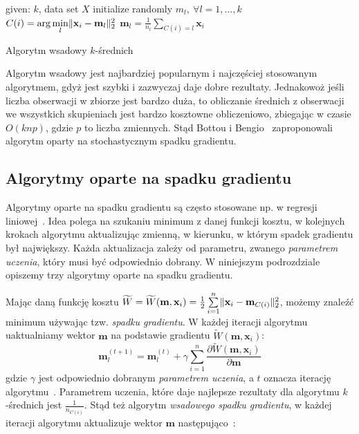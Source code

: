 \documentclass{praca1}
\DeclarePairedDelimiter{\norm}{\lVert}{\rVert}
\begin{document}
\begin{algorithm}[!h]
\begin{algorithmic}[1]
		\State given: $k$, data set $X$
        \State initialize randomly $m_l, \ \forall l=1, ..., k$
        \Repeat
                \State $C(i) = \arg \min\limits_{l} \norm{\mathbf{x}_i - \mathbf{m}_l }_2^2 $
            \EndFor
                \State $\mathbf{m}_l = \frac{1}{n_l}\sum\limits_{C(i) = l} \mathbf{x}_i$
            \EndFor

\end{algorithmic}
\caption{Algorytm wsadowy $k$-średnich}\label{alg:001}
\end{algorithm}

Algorytm wsadowy jest najbardziej popularnym i najczęściej stosowanym algorytmem, gdyż jest szybki i zazwyczaj daje dobre rezultaty. Jednakowoż jeśli liczba obserwacji w zbiorze jest bardzo duża, to obliczanie średnich z obserwacji we wszystkich skupieniach jest bardzo kosztowne obliczeniowo, zbiegając w czasie $O(knp)$, gdzie $p$ to liczba zmiennych. Stąd Bottou i Bengio~\cite{Bottou1995:convergenceproperties} zaproponowali algorytm oparty na stochastycznym spadku gradientu.

\subsection{Algorytmy oparte na spadku gradientu}

Algorytmy oparte na spadku gradientu są często stosowane np. w regresji liniowej~\cite{Bottou2012:sgdtricks}. Idea polega na szukaniu minimum z danej funkcji kosztu, w kolejnych krokach algorytmu aktualizując zmienną, w kierunku, w którym spadek gradientu był największy. Każda aktualizacja zależy od parametru, zwanego \emph{parametrem uczenia}, który musi być odpowiednio dobrany. W niniejszym podrozdziale opiszemy trzy algorytmy oparte na spadku gradientu.


Mając daną funkcję kosztu $\widetilde{W} = \widetilde{W}(\mathbf{m}, \mathbf{x}_i) = \frac{1}{2}\sum\limits_{i=1}^{n} \norm{\mathbf{x}_i - \mathbf{m}_{C(i)}}_2^2 $, możemy znaleźć minimum używając tzw. \emph{spadku gradientu}. W każdej iteracji algorytmu uaktualniamy wektor $\mathbf{m}$ na podstawie gradientu $\widetilde{W}(\mathbf{m}, \mathbf{x}_i)$:
\begin{equation}
\mathbf{m}^{(t+1)}_l = \mathbf{m}_l^{(t)} + \gamma \sum\limits_{i=1}^{n} \frac{\partial \widetilde{W}(\mathbf{m}, \mathbf{x}_i)}{\partial \mathbf{m}}
\end{equation}
gdzie $\gamma$ jest odpowiednio dobranym \emph{parametrem uczenia}, a $t$ oznacza iterację algorytmu~\cite{Bottou2012:sgdtricks}. Parametrem uczenia, które daje najlepsze rezultaty dla algorytmu $k$-średnich jest $\frac{1}{n_{C(i)}}$. Stąd też algorytm \emph{wsadowego spadku gradientu}, w każdej iteracji algorytmu aktualizuje wektor $\mathbf{m}$ następująco~\cite{Bottou1995:convergenceproperties}:
\end{document}

